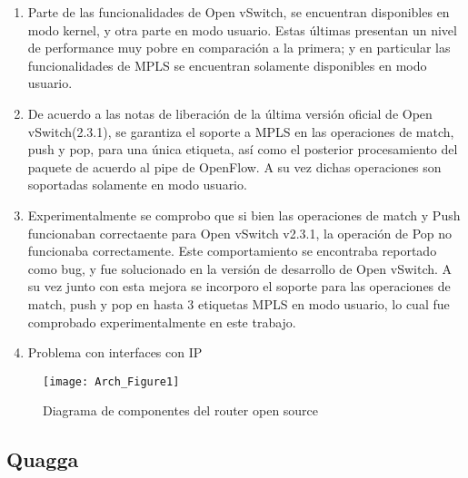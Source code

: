 \begin{enumerate}
\item Parte de las funcionalidades de Open vSwitch, se encuentran disponibles en modo kernel, y otra parte en modo usuario. Estas \'ultimas presentan un nivel de performance muy pobre en comparaci\'on a la primera; y en particular las funcionalidades de MPLS se encuentran solamente disponibles en modo usuario.

\item De acuerdo a las notas de liberaci\'on de la \'ultima versi\'on oficial de Open vSwitch(2.3.1), 
se garantiza el soporte a MPLS en las operaciones de match, push y pop, para una \'unica etiqueta, as\'i como el posterior procesamiento del paquete de acuerdo al pipe de OpenFlow. A su vez dichas operaciones son soportadas solamente en modo usuario.

\item Experimentalmente se comprobo que si bien las operaciones de match y Push funcionaban correctaente para Open vSwitch v2.3.1, la operaci\'on de Pop no funcionaba correctamente. Este comportamiento se encontraba reportado como bug, y fue solucionado en la versi\'on de desarrollo de Open vSwitch. A su vez junto con esta mejora se incorporo el soporte para las operaciones de match, push y pop en hasta 3 etiquetas MPLS en modo usuario, lo cual fue comprobado experimentalmente en este trabajo.

\item Problema con interfaces con IP

\end{enumerate}


\newpage
\begin{figure}[htbp!] 
\centering    
\texttt{[image: Arch\_Figure1]}
\caption[OpenSourceRArch]{Diagrama de componentes del router open source}
\label{fig:OpenSourceRArch}
\end{figure}

\subsection{Quagga}

